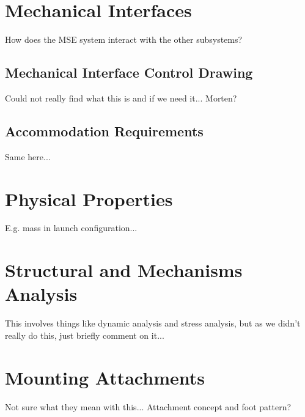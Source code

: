 \section{Mechanical Interfaces}

How does the MSE system interact with the other subsystems?

\subsection{Mechanical Interface Control Drawing}

Could not really find what this is and if we need it... Morten?

\subsection{Accommodation Requirements}

Same here...

\section{Physical Properties}

E.g. mass in launch configuration...

\section{Structural and Mechanisms Analysis}

This involves things like dynamic analysis and stress analysis, but as we didn't really do this, just briefly comment on it...

\section{Mounting Attachments}

Not sure what they mean with this... Attachment concept and foot pattern?